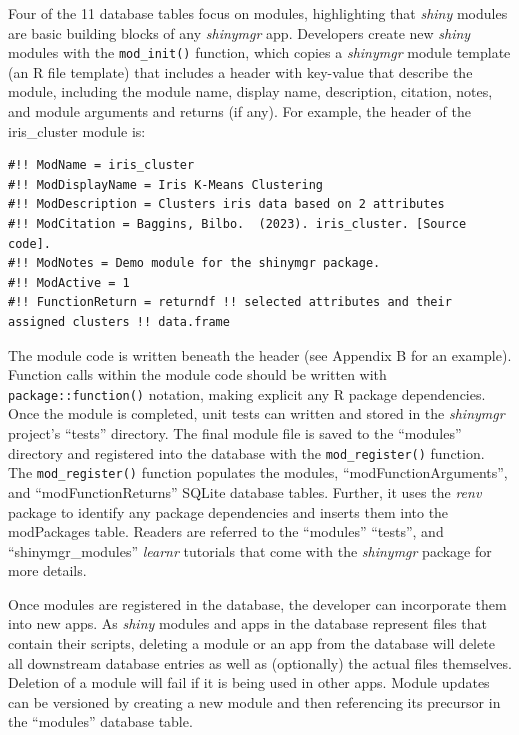 Four of the 11 database tables focus on modules, highlighting that \emph{shiny} modules are basic building blocks of any \emph{shinymgr} app. Developers create new \emph{shiny} modules with the \texttt{mod\_init()} function, which copies a \emph{shinymgr} module template (an R file template) that includes a header with key-value that describe the module, including the module name, display name, description, citation, notes, and module arguments and returns (if any). For example, the header of the iris\_cluster module is:

\begin{verbatim}
#!! ModName = iris_cluster
#!! ModDisplayName = Iris K-Means Clustering
#!! ModDescription = Clusters iris data based on 2 attributes
#!! ModCitation = Baggins, Bilbo.  (2023). iris_cluster. [Source code].
#!! ModNotes = Demo module for the shinymgr package.
#!! ModActive = 1
#!! FunctionReturn = returndf !! selected attributes and their assigned clusters !! data.frame
\end{verbatim}

The module code is written beneath the header (see Appendix B for an example). Function calls within the module code should be written with \texttt{package::function()} notation, making explicit any R package dependencies. Once the module is completed, unit tests can written and stored in the \emph{shinymgr} project's ``tests'' directory. The final module file is saved to the ``modules'' directory and registered into the database with the \texttt{mod\_register()} function. The \texttt{mod\_register()} function populates the modules, ``modFunctionArguments'', and ``modFunctionReturns'' SQLite database tables. Further, it uses the \emph{renv} package to identify any package dependencies and inserts them into the modPackages table. Readers are referred to the ``modules'' ``tests'', and ``shinymgr\_modules'' \emph{learnr} tutorials that come with the \emph{shinymgr} package for more details.

Once modules are registered in the database, the developer can incorporate them into new apps. As \emph{shiny} modules and apps in the database represent files that contain their scripts, deleting a module or an app from the database will delete all downstream database entries as well as (optionally) the actual files themselves. Deletion of a module will fail if it is being used in other apps. Module updates can be versioned by creating a new module and then referencing its precursor in the ``modules'' database table.

